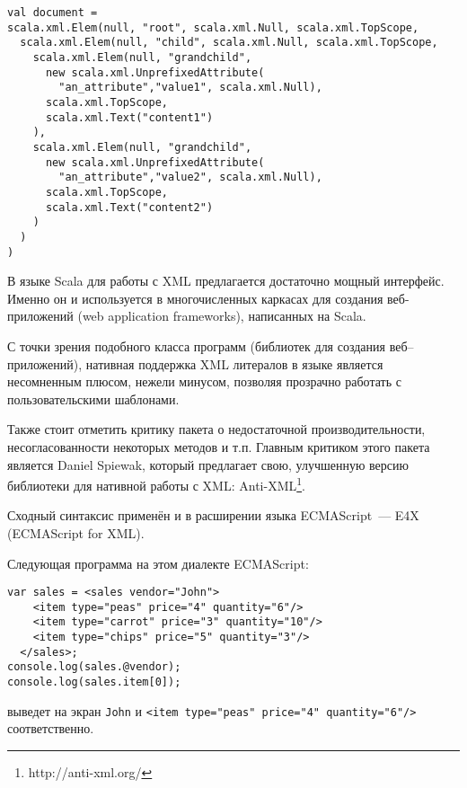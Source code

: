 \begin{code}\begin{lstlisting}[caption={Внутреннее представление XML литералов из примера~\ref{scala-xml-example}.}, label={scala-xml-example-internal}]
val document =
scala.xml.Elem(null, "root", scala.xml.Null, scala.xml.TopScope,
  scala.xml.Elem(null, "child", scala.xml.Null, scala.xml.TopScope,
    scala.xml.Elem(null, "grandchild",
      new scala.xml.UnprefixedAttribute(
        "an_attribute","value1", scala.xml.Null),
      scala.xml.TopScope,
      scala.xml.Text("content1")
    ),
    scala.xml.Elem(null, "grandchild",
      new scala.xml.UnprefixedAttribute(
        "an_attribute","value2", scala.xml.Null),
      scala.xml.TopScope,
      scala.xml.Text("content2")
    )
  )
)
\end{lstlisting}\end{code}

В языке Scala для работы с XML предлагается достаточно мощный интерфейс. Именно он и используется в многочисленных каркасах для создания веб-приложений (web application frameworks), написанных на Scala.

С точки зрения подобного класса программ (библиотек для создания веб--приложений), нативная поддержка XML
литералов в языке является несомненным плюсом, нежели минусом, позволяя прозрачно работать с пользовательскими шаблонами.

Также стоит отметить критику пакета  о недостаточной производительности, несогласованности некоторых методов и т.п.
Главным критиком этого пакета является Daniel Spiewak, который предлагает свою, улучшенную версию библиотеки для нативной работы с XML: Anti-XML\footnote{http://anti-xml.org/}.

Сходный синтаксис применён и в расширении языка ECMAScript~--- E4X~\cite{E4X} (ECMAScript for XML).

Следующая программа на этом диалекте ECMAScript:

\begin{code}\begin{lstlisting}[caption={Пример использования XML литеров в языке ECMAScript for XML.}, label=e4x-xml-example]
var sales = <sales vendor="John">
    <item type="peas" price="4" quantity="6"/>
    <item type="carrot" price="3" quantity="10"/>
    <item type="chips" price="5" quantity="3"/>
  </sales>;
console.log(sales.@vendor);
console.log(sales.item[0]);
\end{lstlisting}\end{code}
выведет на экран \texttt{John} и \texttt{<item type="peas" price="4" quantity="6"/>} соответственно.

